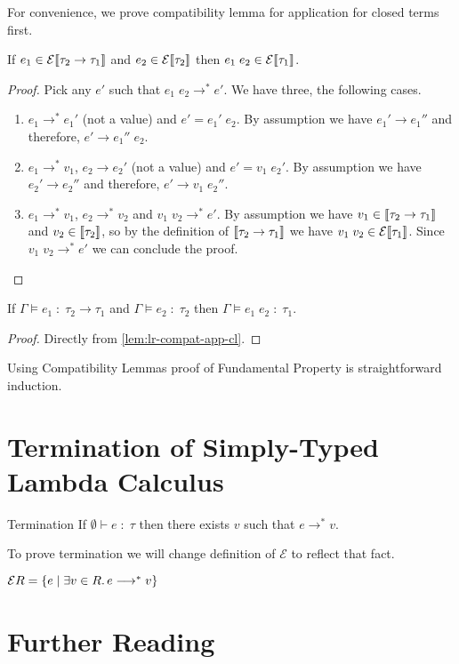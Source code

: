For convenience, we prove compatibility lemma for application
for closed terms first.

\begin{lemma}\label{lem:lr-compat-app-cl}
  If $e_1 \in \mathcal{E}\llbracket\tau_2 \to \tau_1\rrbracket$
  and $e_2 \in \mathcal{E}\llbracket\tau_2\rrbracket$
  then $e_1\;e_2 \in \mathcal{E}\llbracket\tau_1\rrbracket$.
\end{lemma}
\begin{proof}
  Pick any $e'$ such that $e_1\;e_2 \longrightarrow^* e'$.
  We have three, the following cases.
  \begin{enumerate}[label=(\roman*)]
  \item $e_1 \longrightarrow^* e_1'$ (not a value) and $e' = e_1'\;e_2$.
    By assumption we have $e_1' \longrightarrow e_1''$
    and therefore, $e' \longrightarrow e_1''\;e_2$.
  \item $e_1 \longrightarrow^* v_1$, $e_2\longrightarrow e_2'$
    (not a value) and $e' = v_1\;e_2'$.
    By assumption we have $e_2' \longrightarrow e_2''$
    and therefore, $e' \longrightarrow v_1\;e_2''$.
  \item $e_1 \longrightarrow^* v_1$, $e_2 \longrightarrow^* v_2$
    and $v_1\;v_2 \longrightarrow^* e'$.
    By assumption we have $v_1\in\llbracket\tau_2\to\tau_1\rrbracket$
    and $v_2\in\llbracket\tau_2\rrbracket$,
    so by the definition of $\llbracket\tau_2\to\tau_1\rrbracket$
    we have $v_1\;v_2 \in \mathcal{E}\llbracket\tau_1\rrbracket$.
    Since $v_1\;v_2 \longrightarrow^* e'$ we can conclude the proof.
    \qedhere
  \end{enumerate}
\end{proof}

\begin{lemma}
  If $\Gamma \models e_1 \;:\; \tau_2 \to \tau_1 $
  and $\Gamma \models e_2 \;:\; \tau_2$
  then $\Gamma \models e_1\;e_2 \;:\; \tau_1$.
\end{lemma}
\begin{proof}
  Directly from \autoref{lem:lr-compat-app-cl}.
\end{proof}

\medskip

Using Compatibility Lemmas proof of Fundamental Property is straightforward induction.

\section{Termination of Simply-Typed Lambda Calculus}

\begin{theorem}{Termination}
  If $\emptyset \vdash e \;:\; \tau$ then
  there exists $v$ such that $e \longrightarrow^* v$.
\end{theorem}

To prove termination we will change definition of $\mathcal{E}$ to reflect that fact.

$\mathcal{E}R = \{ e \mid \exists v \in R\ldotp e \longrightarrow^* v \}$

\section{Further Reading}

